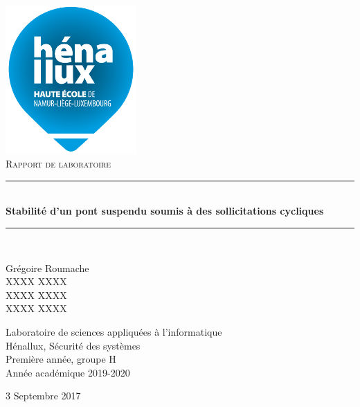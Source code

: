 \documentclass[a4paper]{article}
\newcommand{\HRule}{\rule{\linewidth}{0.5mm}}
\begin{document}
\begin{titlepage}
    \begin{sffamily}
        \begin{center}

            \includegraphics[width=5cm]{images/LogoHenallux.PNG}~\\[1.5cm]
            \textsc{\Large Rapport de laboratoire}\\[1.5cm]

            \HRule \\[0.4cm]
            { \huge \bfseries Stabilité d’un pont suspendu soumis à des sollicitations cycliques \\[0.4cm] }
            \HRule \\[2cm]

            \begin{minipage}{0.4\textwidth}
                \begin{flushleft} \large
                    Grégoire Roumache \\
                    XXXX XXXX \\
                    XXXX XXXX \\
                    XXXX XXXX \\
                \end{flushleft}
            \end{minipage}
            \begin{minipage}{0.55\textwidth}
                \begin{flushright} \large
                    Laboratoire de sciences appliquées à l'informatique \\
                    Hénallux, Sécurité des systèmes \\
                    Première année, groupe H \\
                    Année académique 2019-2020 \\
                \end{flushright}
            \end{minipage}
            \vfill

            {\large 3 Septembre 2017}

        \end{center}
    \end{sffamily}
\end{titlepage}
\end{document}
